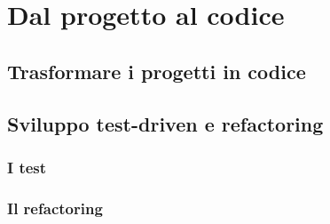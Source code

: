 \chapter{Dal progetto al codice}

\section{Trasformare i progetti in codice}

\section{Sviluppo test-driven e refactoring}

\subsection{I test}

\subsection{Il refactoring}